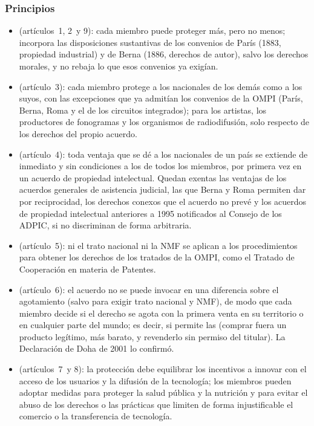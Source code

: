 \documentclass[11pt]{article}
\begin{document}
\subsubsection{Principios}\label{sec:adpic-principios}

\begin{itemize}
\item {} (artículos~1, 2~y 9): cada miembro puede proteger más, pero no menos; incorpora las disposiciones sustantivas de los convenios de París (1883, propiedad industrial) y de Berna (1886, derechos de autor), salvo los derechos morales, y no rebaja lo que esos convenios ya exigían\nocite{OMC1994ADPIC}.
\item {} (artículo~3): cada miembro protege a los nacionales de los demás como a los suyos, con las excepciones que ya admitían los convenios de la OMPI (París, Berna, Roma y el de los circuitos integrados); para los artistas, los productores de fonogramas y los organismos de radiodifusión, solo respecto de los derechos del propio acuerdo.
\item {} (artículo~4): toda ventaja que se dé a los nacionales de un país se extiende de inmediato y sin condiciones a los de todos los miembros, por primera vez en un acuerdo de propiedad intelectual. Quedan exentas las ventajas de los acuerdos generales de asistencia judicial, las que Berna y Roma permiten dar por reciprocidad, los derechos conexos que el acuerdo no prevé y los acuerdos de propiedad intelectual anteriores a 1995 notificados al Consejo de los ADPIC, si no discriminan de forma arbitraria.
\item {} (artículo~5): ni el trato nacional ni la NMF se aplican a los procedimientos para obtener los derechos de los tratados de la OMPI, como el Tratado de Cooperación en materia de Patentes.
\item {} (artículo~6): el acuerdo no se puede invocar en una diferencia sobre el agotamiento (salvo para exigir trato nacional y NMF), de modo que cada miembro decide si el derecho se agota con la primera venta en su territorio o en cualquier parte del mundo; es decir, si permite las  (comprar fuera un producto legítimo, más barato, y revenderlo sin permiso del titular). La Declaración de Doha de 2001 lo confirmó.
\item {} (artículos~7~y 8): la protección debe equilibrar los incentivos a innovar con el acceso de los usuarios y la difusión de la tecnología; los miembros pueden adoptar medidas para proteger la salud pública y la nutrición y para evitar el abuso de los derechos o las prácticas que limiten de forma injustificable el comercio o la transferencia de tecnología.
\end{itemize}
\end{document}
